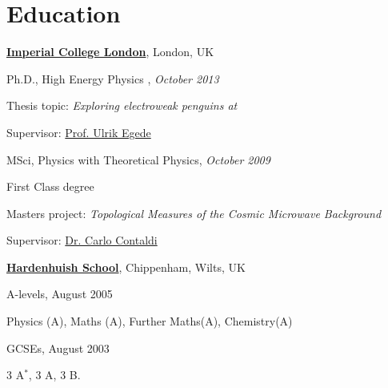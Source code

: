 \documentclass[10pt]{article}
\renewenvironment{compactitem}{
  \begin{list}{}{
    \setlength{\leftmargin}{1.5em}
  }
}{
  \end{list}
}
\begin{document}
\section*{Education}
%
\href{http://www.imperial.ac.uk/}{\textbf{Imperial College London}},
London, UK
\begin{compactitem}
\item Ph.D., High Energy Physics , \textit{October 2013}
        \begin{compactitem}
        \item Thesis topic: \emph{Exploring \bquark \to \squark electroweak penguins at \lhcb}
        \item Supervisor:
              \href{http://www3.imperial.ac.uk/people/u.egede}
                   {Prof. Ulrik Egede}
        \end{compactitem}
\item MSci, {Physics with Theoretical Physics}, \textit{October 2009}
        \begin{compactitem}
        \item First Class degree
        \item Masters project: \emph{Topological Measures of the Cosmic Microwave Background}
        \item Supervisor:
              \href{http://www3.imperial.ac.uk/people/c.contaldi}
                   {Dr. Carlo Contaldi}

        \end{compactitem}
\end{compactitem}
\href{http://www.hardenhuish.wilts.sch.uk/hardenhuish/site/}{\textbf{Hardenhuish School}},
Chippenham, Wilts, UK
\begin{compactitem}
\item A-levels, August 2005
        \begin{compactitem}
        \item Physics (A), Maths (A), Further Maths(A), Chemistry(A)
        \end{compactitem}
\item GCSEs, August 2003
        \begin{compactitem}
        \item 3 A$^{*}$, 3 A, 3 B.
        \end{compactitem}
\end{compactitem}
\end{document}
